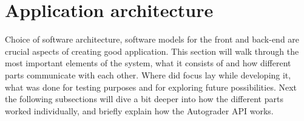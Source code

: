 


\section{Application architecture}
Choice of software architecture, software models for the front and back-end are crucial aspects of creating good application. This section will walk through the most important elements of the system, what it consists of and how different parts communicate with each other. Where did focus lay while developing it, what was done for testing purposes and for exploring future possibilities. Next the following subsections will dive a bit deeper into how the different parts worked individually, and briefly explain how the Autograder API works.

